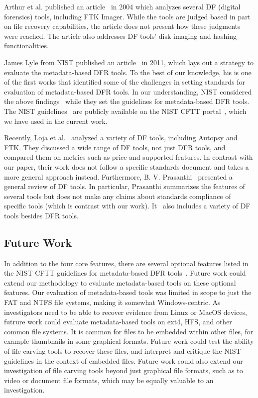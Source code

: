 \begin{paraphrase}
 Arthur et al. published an article~\cite{arthur2004} in 2004 which analyzes several DF (digital forensics) tools, including FTK Imager.
While the tools are judged based in part on file recovery capabilities, the article does not present how these judgments were reached.
The article also addresses DF tools' disk imaging and hashing functionalities.

James Lyle from NIST published an article~\cite{lyle2011-ICDF2C} in 2011, which lays out a strategy to evaluate the metadata-based DFR tools. To the best of our knowledge, 
his is one of the first works that identified some of the challenges in setting standards for evaluation of metadata-based DFR tools.
In our understanding, NIST considered the above findings~\cite{lyle2011-ICDF2C} while they set the guidelines for metadata-based DFR tools.  
The NIST guidelines~\cite{meta:dfr:standards} are publicly available on the NIST CFTT portal~\cite{cftt:nist}, which we have used in the current work.

Recently, Loja et al.~\cite{loja2016} analyzed a variety of DF tools, including Autopsy and FTK. 
They discussed a wide range of DF tools, not just DFR tools, and compared them on metrics such as price and supported features. 
In contrast with our paper, their work does not follow a specific standards document and takes a more general approach instead.
Furthermore, B. V. Prasanthi~\cite{prasanthi2016} presented a general review of DF tools. 
In particular, Prasanthi summarizes the features of several tools but does not make any claims about standards compliance of specific tools (which is contrast with our work).
It~\cite{prasanthi2016} also includes a variety of DF tools besides DFR tools.
\end{paraphrase}


\subsection{Future Work}

In addition to the four core features, there are several optional features listed in the NIST CFTT guidelines for metadata-based DFR tools~\cite{meta:dfr:standards}.
Future work could extend our methodology to evaluate metadata-based tools on these optional features.
Our evaluation of metadata-based tools was limited in scope to just the FAT and NTFS file systems, making it somewhat Windows-centric.
As investigators need to be able to recover evidence from Linux or MacOS devices, futrure work could evaluate metadata-based tools on ext4, HFS, and other common file systems.
It is common for files to be embedded within other files, for example thumbnails in some graphical formats.
Future work could test the ability of file carving tools to recover these files, and interpret and critique the NIST guidelines in the context of embedded files.
Future work could also extend our investigation of file carving tools beyond just graphical file formats, such as to video or document file formats, which may be equally valuable to an investigation.
